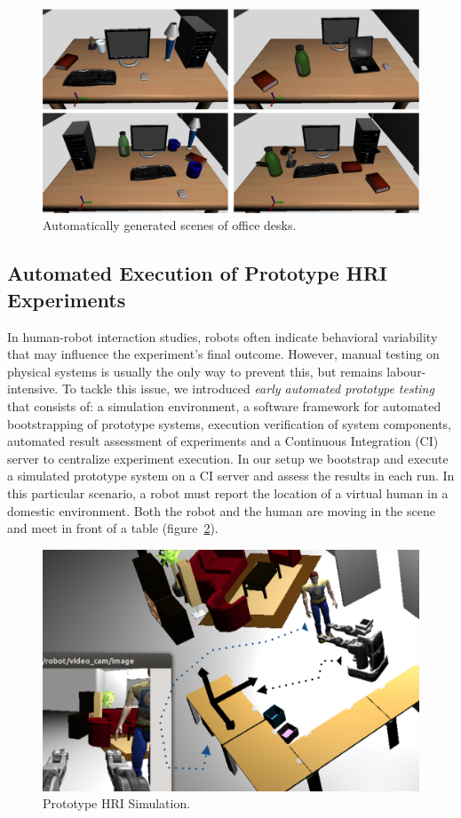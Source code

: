 \documentclass[conference]{IEEEtran}
\begin{document}
\begin{figure}[tb]
  \centering
  \includegraphics[width=.9\columnwidth]{figs/scenes.png}
  \caption{Automatically generated scenes of office desks.}
  \label{fig:simulated-desktop-scenes}
\end{figure}


\subsection{Automated Execution of Prototype HRI Experiments}
\label{sc:ci}

In human-robot interaction studies, robots often indicate behavioral variability
that may influence the experiment's final outcome.  However, manual testing on
physical systems is usually the only way to prevent this, but remains
labour-intensive. To tackle this issue, we introduced \emph{early automated
prototype testing}~\cite{2645922} that consists of: a simulation environment, a
software framework for automated bootstrapping of prototype systems, execution
verification of system components, automated result assessment of experiments
and a Continuous Integration (CI) server to centralize experiment execution. In
our setup we bootstrap and execute a simulated prototype system on a CI server
and assess the results in each run. In this particular scenario, a robot must
report the location of a virtual human in a domestic environment. Both the
robot and the human are moving in the scene and meet in front of a table
(figure~\ref{fig|proto}).

\begin{figure}[H]
      \centering
      \includegraphics[width=0.9\linewidth]{proto-setup.png}
      \caption{Prototype HRI Simulation.}
      \label{fig|proto}
\end{figure}
\end{document}
